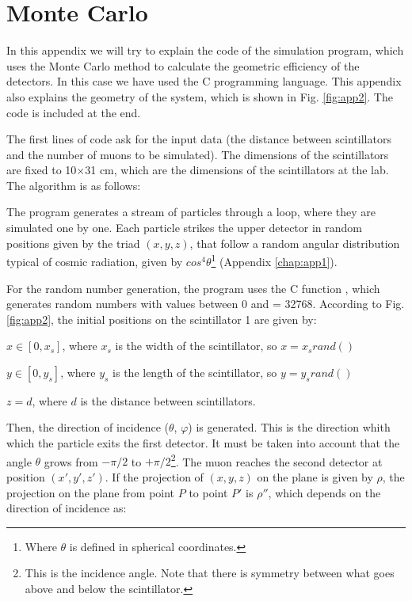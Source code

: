 \cleardoublepage
\chapter{Monte Carlo}\label{chap:app2}

In this appendix we will try to explain the code of the simulation program, which uses the Monte Carlo method to calculate the geometric efficiency of the detectors. In this case we have used the C programming language. This appendix also explains the geometry of the system, which is shown in Fig. \ref{fig:app2}. The code is included at the end.

The first lines of code ask for the input data (the distance between scintillators and the number of muons to be simulated). The dimensions of the scintillators are fixed to 10$\times$31 cm, which are the dimensions of the scintillators at the lab. The algorithm is as follows:

\ben
	\item The program generates a stream of particles through a  loop, where they are simulated one by one. Each particle strikes the upper detector in random positions given by the triad $(x, y, z)$, that follow a random angular distribution typical of cosmic radiation, given by $cos^4\theta$\footnote{Where $\theta$ is defined in spherical coordinates.} (Appendix \ref{chap:app1}).

	\item For the random number generation, the program uses the C function , which generates random numbers with values between 0 and  = 32768. According to Fig. \ref{fig:app2}, the initial positions on the scintillator 1 are given by:
	\bi
		\item $x \in [0, x_s]$, where $x_s$ is the width of the scintillator, so $x = x_srand()$
		\item $y \in [0, y_s]$, where $y_s$ is the length of the scintillator, so $y = y_srand()$
		\item $z = d$, where $d$ is the distance between scintillators.
	\ei

	\item Then, the direction of incidence ($\theta$, $\varphi$) is generated. This is the direction whith which the particle exits the first detector. It must be taken into account that the angle $\theta$ grows from $-\pi / 2$ to $+\pi / 2$\footnote{This is the incidence angle. Note that there is symmetry between what goes above and below the scintillator.}. The muon reaches the second detector at position $(x', y', z')$. If the projection of $(x, y, z)$ on the plane is given by $\rho$, the projection on the plane from point $P$ to point $P'$ is $\rho''$, which depends on the direction of incidence as:


